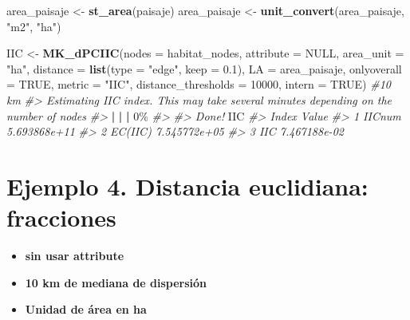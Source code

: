 \documentclass[
]{book}
\newenvironment{Shaded}{\begin{snugshade}}{\end{snugshade}}
\newcommand{\AttributeTok}[1]{\textcolor[rgb]{0.13,0.29,0.53}{#1}}
\newcommand{\CommentTok}[1]{\textcolor[rgb]{0.56,0.35,0.01}{\textit{#1}}}
\newcommand{\ConstantTok}[1]{\textcolor[rgb]{0.56,0.35,0.01}{#1}}
\newcommand{\DecValTok}[1]{\textcolor[rgb]{0.00,0.00,0.81}{#1}}
\newcommand{\ErrorTok}[1]{\textcolor[rgb]{0.64,0.00,0.00}{\textbf{#1}}}
\newcommand{\FloatTok}[1]{\textcolor[rgb]{0.00,0.00,0.81}{#1}}
\newcommand{\FunctionTok}[1]{\textcolor[rgb]{0.13,0.29,0.53}{\textbf{#1}}}
\newcommand{\NormalTok}[1]{#1}
\newcommand{\OtherTok}[1]{\textcolor[rgb]{0.56,0.35,0.01}{#1}}
\newcommand{\SpecialCharTok}[1]{\textcolor[rgb]{0.81,0.36,0.00}{\textbf{#1}}}
\newcommand{\StringTok}[1]{\textcolor[rgb]{0.31,0.60,0.02}{#1}}
\providecommand{\tightlist}{%
  \setlength{\itemsep}{0pt}\setlength{\parskip}{0pt}}
\begin{document}
\begin{Shaded}
\begin{Highlighting}[]
\NormalTok{area\_paisaje }\OtherTok{\textless{}{-}} \FunctionTok{st\_area}\NormalTok{(paisaje) }
\NormalTok{area\_paisaje }\OtherTok{\textless{}{-}} \FunctionTok{unit\_convert}\NormalTok{(area\_paisaje, }\StringTok{"m2"}\NormalTok{, }\StringTok{"ha"}\NormalTok{) }

\NormalTok{IIC }\OtherTok{\textless{}{-}} \FunctionTok{MK\_dPCIIC}\NormalTok{(}\AttributeTok{nodes =}\NormalTok{ habitat\_nodes,}
                \AttributeTok{attribute =} \ConstantTok{NULL}\NormalTok{,}
                \AttributeTok{area\_unit =} \StringTok{"ha"}\NormalTok{,}
                \AttributeTok{distance =} \FunctionTok{list}\NormalTok{(}\AttributeTok{type =} \StringTok{"edge"}\NormalTok{, }\AttributeTok{keep =} \FloatTok{0.1}\NormalTok{),}
                \AttributeTok{LA =}\NormalTok{ area\_paisaje,}
                \AttributeTok{onlyoverall =} \ConstantTok{TRUE}\NormalTok{,}
                \AttributeTok{metric =} \StringTok{"IIC"}\NormalTok{,}
                \AttributeTok{distance\_thresholds =} \DecValTok{10000}\NormalTok{,}
                \AttributeTok{intern =} \ConstantTok{TRUE}\NormalTok{) }\CommentTok{\#10 km}
\CommentTok{\#\textgreater{} Estimating IIC index. This may take several minutes depending on the number of nodes}
\CommentTok{\#\textgreater{} }
  \SpecialCharTok{|}                                                        
  \ErrorTok{|}                                                  \ErrorTok{|}   \DecValTok{0}\NormalTok{\%}
\CommentTok{\#\textgreater{} }
\CommentTok{\#\textgreater{} Done!}
\NormalTok{IIC}
\CommentTok{\#\textgreater{}     Index        Value}
\CommentTok{\#\textgreater{} 1  IICnum 5.693868e+11}
\CommentTok{\#\textgreater{} 2 EC(IIC) 7.545772e+05}
\CommentTok{\#\textgreater{} 3     IIC 7.467188e{-}02}
\end{Highlighting}
\end{Shaded}

\section{Ejemplo 4. Distancia euclidiana: fracciones}\label{ejemplo-4.-distancia-euclidiana-fracciones}

\begin{itemize}
\tightlist
\item
  \textbf{sin usar attribute}
\item
  \textbf{10 km de mediana de dispersión}
\item
  \textbf{Unidad de área en ha}
\end{itemize}
\end{document}
